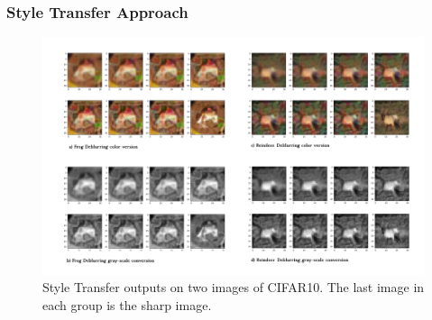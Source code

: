 \documentclass [handout] {beamer}
\begin{document}
\begin{frame}
	\frametitle{Style Transfer Approach}
	\begin{figure}[hptb]
	\centering
	\includegraphics[scale=0.07]{style_outputs.png} 
	\caption{Style Transfer outputs on two images of CIFAR10. The last image in each group is the 	sharp image.}
	\label{style_outputs}
	\end{figure}
\end{frame}
\end{document}
